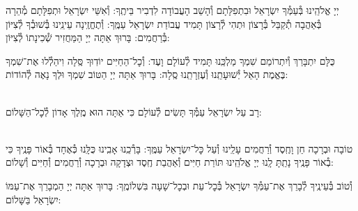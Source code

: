 \documentclass[twoside, openany, parskip=half, 11pt]{book}
\begin{document}
יְיָ אֱלֹהֵֽינוּ בְּ֯עַמְּ֯ךָ יִשְׂרָאֵל וּבִתְפִלָּתָם וְ֯הָשֵׁב הָעֲבוֹדָה לִדְבִיר בֵּיתֶֽךָ: וְ֯אִשֵּׁי יִשְׂרָאֵל וּתְפִלָּתָם מְ֯הֵרָה בְּ֯אַהֲבָה תְ֯קַבֵּל בְּ֯רָצוֹן וּתְהִי לְ֯רָצוֹן תָּמִיד עֲבוֹדַת יִשְׂרָאֵל עַמֶּֽךָ: וְ֯תֶחֱזֶֽינָה עֵינֵֽינוּ בְּ֯שׁוּבְ֯ךָ לְ֯צִיּוֹן בְּ֯רַחֲמִים: בָּרוּךְ אַתָּה יְיָ הַמַּחֲזִיר שְׁ֯כִינָתוֹ לְ֯צִיּוֹן:

\modim

כֻּלָּם יִתְבָּרַךְ וְ֯יִתְרוֹמַם שִׁמְךָ מַלְכֵּֽנוּ תָּמִיד לְ֯עוֹלָם וָעֶד: וְ֯כׇל־הַחַיִּים יוֹדֽוּךָ סֶּֽלָה וִיהַלְ֯לוּ אֶת־שִׁמְךָ בֶּאֱמֶת הָאֵל יְ֯שׁוּעָתֵֽנוּ וְ֯עֶזְרָתֵֽנוּ סֶֽלָה: בָּרוּךְ אַתָּה יְיָ הַטּוֹב שִׁמְךָ וּלְךָ נָאֶה לְ֯הוֹדוֹת:







\begin{paracol}{2}

\\
רָב עַל יִשְׂרָאֵל עַמְּ֯ךָ תָּשִׂים לְ֯עוֹלָם כִּי אַתָּה הוּא מֶֽלֶךְ אָדוֹן לְ֯כׇל־הַשָּׁלוֹם:

\switchcolumn


\begin{small}
\\
טוֹבָה וּבְרָכָה חֵן וָחֶֽסֶד וְ֯רַחֲמִים עָלֵֽינוּ וְ֯עַל כׇּל־יִשְׂרָאֵל עַמֶּֽךָ: בָּרְ֯כֵֽנוּ אָבִֽינוּ כֻּלָּֽנוּ כְּ֯אֶחָד בְּ֯אוֹר פָּנֶֽיךָ כִּי בְ֯אוֹר פָּנֶֽיךָ נָתַֽתָּ לָֽנוּ יְיָ אֱלֹהֵֽינוּ תּוֹרַת חַיִּים וְ֯אַהֲבַת חֶֽסֶד וּצְדָקָה וּבְרָכָה וְ֯רַחֲמִים וְ֯חַיִּים וְ֯שָׁלוֹם:

\end{small}


\end{paracol}
וְ֯טוֹב בְּ֯עֵינֶֽיךָ לְ֯בָרֵךְ אֶת־עַמְּ֯ךָ יִשְׂרָאֵל בְּ֯כׇל־עֵת וּבְכׇל־שָׁעָה בִּשְׁלוֹמֶֽךָ: בָּרוּךְ אַתָּה יְיָ הַמְבָרֵךְ אֶת־עַמּוֹ יִשְׂרָאֵל בַּשָּׁלוֹם:

\tachanunim


\vfill

\end{document}
